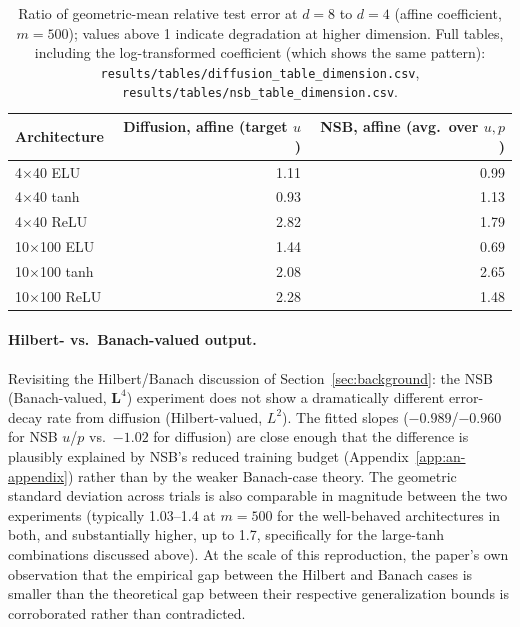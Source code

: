 \begin{table}[htbp]
    \centering
    \begin{tabular}{lrr}
        \toprule
        Architecture & Diffusion, affine (target $u$) & NSB, affine (avg.\ over $u,p$) \\
        \midrule
        4$\times$40 ELU  & 1.11 & 0.99 \\
        4$\times$40 tanh & 0.93 & 1.13 \\
        4$\times$40 ReLU & 2.82 & 1.79 \\
        10$\times$100 ELU  & 1.44 & 0.69 \\
        10$\times$100 tanh & 2.08 & 2.65 \\
        10$\times$100 ReLU & 2.28 & 1.48 \\
        \bottomrule
    \end{tabular}
    \caption{Ratio of geometric-mean relative test error at $d=8$ to $d=4$
    (affine coefficient, $m=500$); values above 1 indicate degradation at
    higher dimension. Full tables, including the log-transformed
    coefficient (which shows the same pattern):
    \texttt{results/tables/diffusion\_table\_dimension.csv},
    \texttt{results/tables/nsb\_table\_dimension.csv}.}
    \label{tab:dimension}
\end{table}

\paragraph{Hilbert- vs.\ Banach-valued output.} Revisiting the
Hilbert/Banach discussion of Section~\ref{sec:background}: the NSB
(Banach-valued, $\mathbf{L}^4$) experiment does not show a dramatically
different error-decay rate from diffusion (Hilbert-valued, $L^2$). The
fitted slopes ($-0.989$/$-0.960$ for NSB $u$/$p$ vs.\ $-1.02$ for diffusion)
are close enough that the difference is plausibly explained by NSB's
reduced training budget (Appendix~\ref{app:an-appendix}) rather than by
the weaker Banach-case theory. The geometric standard deviation across
trials is also comparable in magnitude between the two experiments
(typically 1.03--1.4 at $m=500$ for the well-behaved architectures in
both, and substantially higher, up to 1.7, specifically for the
large-tanh combinations discussed above). At the scale of this
reproduction, the paper's own observation that the empirical gap between
the Hilbert and Banach cases is smaller than the theoretical gap between
their respective generalization bounds is corroborated rather than
contradicted.

